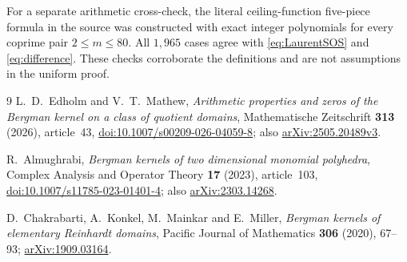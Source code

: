 \documentclass[11pt]{article}
\begin{document}
For a separate arithmetic cross-check, the literal ceiling-function
five-piece formula in the source was constructed with exact integer
polynomials for every coprime pair $2\leq m\leq80$. All $1,965$ cases
agree with \eqref{eq:LaurentSOS} and \eqref{eq:difference}. These checks
corroborate the definitions and are not assumptions in the uniform
proof.

\begin{thebibliography}{9}
L.~D.~Edholm and V.~T.~Mathew,
\emph{Arithmetic properties and zeros of the Bergman kernel on a class
of quotient domains},
Mathematische Zeitschrift \textbf{313} (2026), article~43,
\href{https://doi.org/10.1007/s00209-026-04059-8}{doi:10.1007/s00209-026-04059-8};
also \href{https://arxiv.org/abs/2505.20489v3}{arXiv:2505.20489v3}.

R.~Almughrabi,
\emph{Bergman kernels of two dimensional monomial polyhedra},
Complex Analysis and Operator Theory \textbf{17} (2023), article~103,
\href{https://doi.org/10.1007/s11785-023-01401-4}{doi:10.1007/s11785-023-01401-4};
also \href{https://arxiv.org/abs/2303.14268}{arXiv:2303.14268}.

D.~Chakrabarti, A.~Konkel, M.~Mainkar and E.~Miller,
\emph{Bergman kernels of elementary Reinhardt domains},
Pacific Journal of Mathematics \textbf{306} (2020), 67--93;
\href{https://arxiv.org/abs/1909.03164}{arXiv:1909.03164}.
\end{thebibliography}
\end{document}
